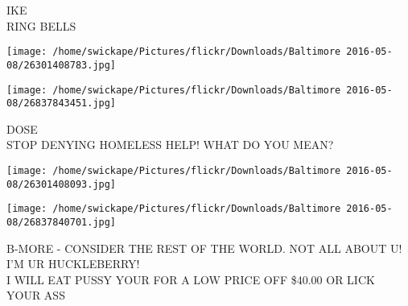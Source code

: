 \documentclass[10pt,letterpaper]{article}
\begin{document}
IKE\\
RING BELLS\\
\pagebreak

\texttt{[image: /home/swickape/Pictures/flickr/Downloads/Baltimore 2016-05-08/26301408783.jpg]}

\vspace{0.25in}
\texttt{[image: /home/swickape/Pictures/flickr/Downloads/Baltimore 2016-05-08/26837843451.jpg]}

DOSE\\
STOP DENYING HOMELESS HELP!  WHAT DO YOU MEAN?\\
\pagebreak

\texttt{[image: /home/swickape/Pictures/flickr/Downloads/Baltimore 2016-05-08/26301408093.jpg]}

\vspace{0.25in}
\texttt{[image: /home/swickape/Pictures/flickr/Downloads/Baltimore 2016-05-08/26837840701.jpg]}

B{-}MORE {-} CONSIDER THE REST OF THE WORLD.  NOT ALL ABOUT U!  I'M UR HUCKLEBERRY!\\
I WILL EAT PUSSY YOUR FOR A LOW PRICE OFF \$40.00 OR LICK YOUR ASS\\
\pagebreak
\end{document}
